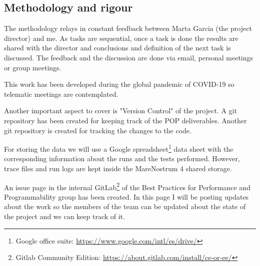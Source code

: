 \subsection{Methodology and rigour}

The methodology relays in constant feedback between Marta Garcia (the project director) and me. As tasks are sequential, once a task is done the results are shared with the director and conclusions and definition of the next task is discussed. The feedback and the discussion are done via email, personal meetings or group meetings.

This work has been developed during the global pandemic of COVID-19 so telematic meetings are contemplated.

Another important aspect to cover is "Version Control" of the project. A git repository has been created for keeping track of the POP deliverables. Another git repository is created for tracking the changes to the code.

For storing the data we will use a Google  spreadsheet\footnote{Google office suite: \url{https://www.google.com/intl/es/drive/}} data sheet with the corresponding information about the runs and the tests performed. However, trace files and run logs are kept inside the MareNostrum 4 shared storage.

An issue page in the internal GitLab\footnote{Gitlab Community Edition: \url{https://about.gitlab.com/install/ce-or-ee/}} of the Best Practices for Performance and Programmability group has been created. In this page I will be posting updates about the work so the members of the team can be updated about the state of the project and we can keep track of it.

\clearpage
